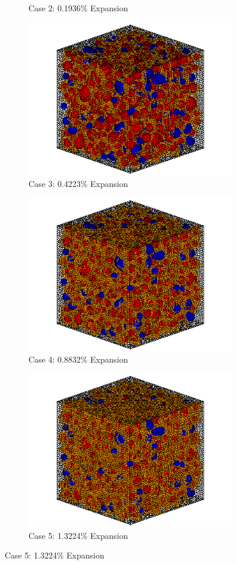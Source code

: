 \begin{figure}[!h]
\begin{subfigure}{.5\textwidth}
    \caption{Case 2: 0.1936\% Expansion}
    \end{subfigure}%
    \begin{subfigure}{.5\textwidth}
      \centering
      \includegraphics[width=.8\linewidth]{Files/exp_3D/ASR/A30P75_3_c.png}
    \caption{Case 3: 0.4223\% Expansion}
    \end{subfigure}
    \begin{subfigure}{.5\textwidth}
      \centering
      \includegraphics[width=.8\linewidth]{Files/exp_3D/ASR/A30P75_4_c.png}
    \caption{Case 4: 0.8832\% Expansion}
    \end{subfigure}%
    \begin{subfigure}{.5\textwidth}
      \centering
      \includegraphics[width=.8\linewidth]{Files/exp_3D/ASR/A30P75_5_c.png}
    \caption{Case 5: 1.3224\% Expansion}
    \end{subfigure}


\end{figure}
